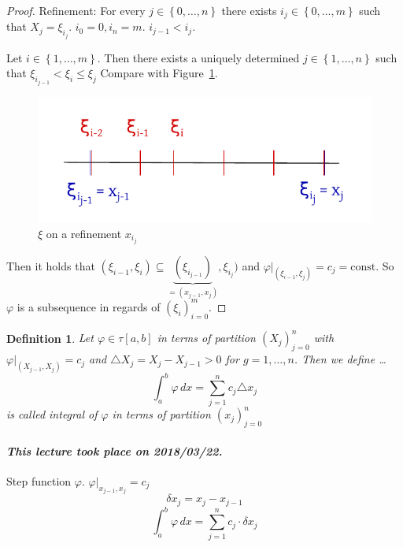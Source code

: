 \documentclass{article}
\newtheorem{definition}{Definition}  \numberwithin{definition}{section}
\newcommand{\set}[1]{\left\{#1\right\}}
\newcommand{\dateref}[1]{\paragraph{\textit{This lecture took place on #1.}}}
\begin{document}
\begin{proof}
  Refinement: For every $j \in \set{0,\dots,n}$ there exists $i_j \in \set{0,\dots,m}$ such that $X_j = \xi_{i_j}$.
  $i_0 = 0, i_n = m$. $i_{j-1} < i_j$.

  Let $i \in \set{1, \dots, m}$. Then there exists a uniquely determined $j \in \set{1, \dots, n}$ such that $\xi_{i_{j-1}} < \xi_i \leq \xi_j$
  Compare with Figure~\ref{img:xi}.

  \begin{figure}[t]
    \begin{center}
      \includegraphics{img/11_xi.pdf}
      \caption{$\xi$ on a refinement $x_{i_j}$}
      \label{img:xi}
    \end{center}
  \end{figure}

  Then it holds that $(\xi_{i-1}, \xi_i) \subseteq \underbrace{(\xi_{i_{j-1}})}_{= (x_{j-1}, x_j)}, \xi_{i_j})$ and $\varphi|_{(\xi_{i-1}, \xi_j)} = c_j = \text{const}$. So $\varphi$ is a subsequence in regards of $(\xi_i)_{i=0}^m$.
\end{proof}

\begin{definition}
  Let $\varphi \in \tau[a,b]$ in terms of partition $(X_j)_{j=0}^n$ with $\varphi|_{(X_{j-1}, X_j)} = c_j$ and $\triangle X_j = X_j - X_{j-1} > 0$ for $g = 1,\dots,n$. Then we define \dots
  \[ \int_a^b \varphi \, dx = \sum_{j=1}^n c_j \triangle x_j \]
  is called \emph{integral of $\varphi$} in terms of partition $(x_j)_{j=0}^n$
\end{definition}

\dateref{2018/03/22}

Step function $\varphi$. $\varphi|_{x_{j-1},x_j} = c_j$
\[ \delta x_j = x_j - x_{j-1} \]
\[ \int_a^b \varphi \, dx = \sum_{j=1}^n c_j \cdot \delta x_j \]
\end{document}
